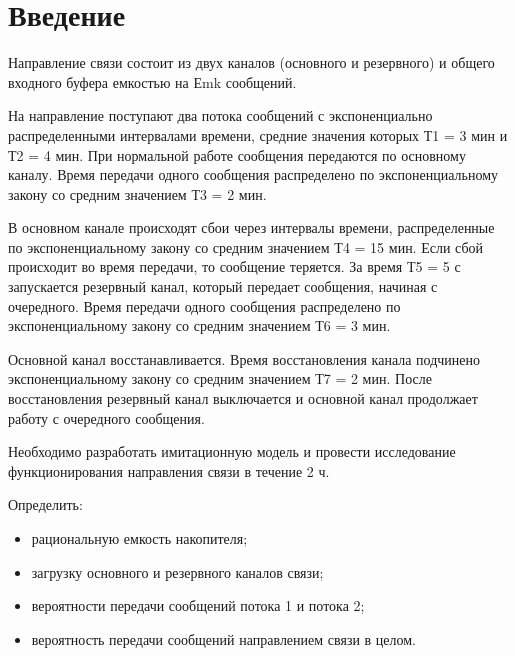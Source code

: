 \graphicspath{{./img}} %

\section*{\LARGE Введение}
Направление связи состоит из двух каналов (основного и
резервного) и общего входного буфера емкостью на Еmk
сообщений.\par
На направление поступают два потока сообщений с
экспоненциально распределенными интервалами времени, средние
значения которых Т1 = 3 мин и Т2 = 4 мин. При нормальной
работе сообщения передаются по основному каналу. Время
передачи одного сообщения распределено по экспоненциальному
закону со средним значением Т3 = 2 мин.\par
В основном канале происходят сбои через интервалы времени,
распределенные по экспоненциальному закону со средним
значением Т4 = 15 мин. Если сбой происходит во время передачи,
то сообщение теряется. За время Т5 = 5 с запускается резервный
канал, который передает сообщения, начиная с очередного. Время
передачи одного сообщения распределено по экспоненциальному
закону со средним значением Т6 = 3 мин.\par
Основной канал восстанавливается. Время восстановления
канала подчинено экспоненциальному закону со средним
значением Т7 = 2 мин. После восстановления резервный канал
выключается и основной канал продолжает работу с очередного
сообщения.\par
Необходимо разработать имитационную модель и провести
исследование функционирования направления связи в течение 2 ч.\par
Определить:
\begin{itemize}
	\item рациональную емкость накопителя;
	\item загрузку основного и резервного каналов связи;
	\item вероятности передачи сообщений потока 1 и потока 2;
	\item вероятность передачи сообщений направлением связи в целом. 
\end{itemize}

\clearpage

